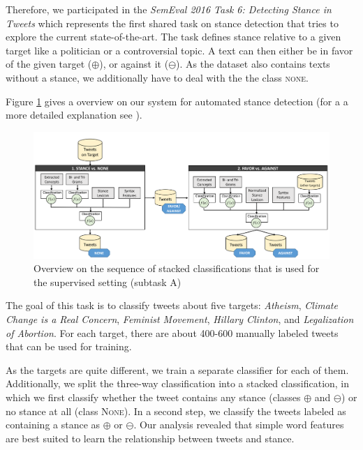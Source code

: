 \documentclass[11pt]{article}
\begin{document}
Therefore, we participated in the \textit{\mbox{SemEval} 2016 Task 6: Detecting Stance in Tweets} which represents the first shared task on stance detection that tries to explore the current state-of-the-art.
The task defines stance relative to a given target like a politician or a controversial topic.
A text can then either be in favor of the given target ($\oplus$), or against it ($\ominus$).
As the dataset also contains texts without a stance, we additionally have to deal with the the class \textsc{none}.

Figure \ref{fig:sketch1} gives a overview on our system for automated stance detection (for a a more detailed explanation see ).

\begin{figure}
  \centering
  \includegraphics[scale=0.25]{figures/stance_skizze_new.png}
  \caption{Overview on the sequence of stacked classifications that is used for the supervised setting (subtask A)}
  \label{fig:sketch1}
\end{figure}

The goal of this task is to classify tweets about five targets: \textit{Atheism}, \textit{Climate Change is a Real Concern}, \textit{Feminist Movement}, \textit{Hillary Clinton}, and \textit{Legalization of Abortion}.
For each target, there are about 400-600 manually labeled tweets that can be used for training.

As the targets are quite different, we train a separate classifier for each of them. 
Additionally, we split the three-way classification into a stacked classification, in which we first classify whether the tweet contains any stance (classes $\oplus$ and $\ominus$) or no stance at all (class \textsc{None}).
In a second step, we classify the tweets labeled as containing a stance as $\oplus$ or $\ominus$.
Our analysis revealed that simple word features are best suited to learn the relationship between tweets and stance.
\end{document}
